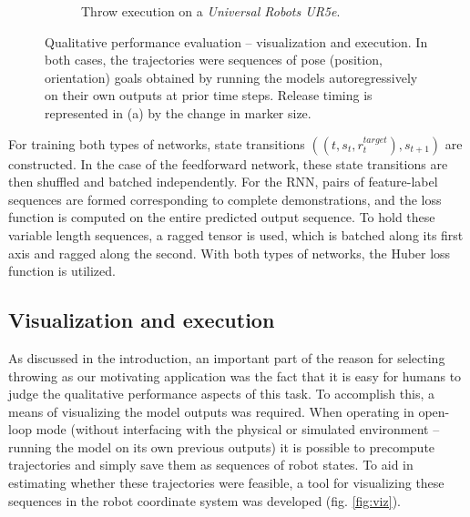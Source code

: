 \documentclass{article}
\begin{document}
\begin{figure}
{\begin{subfigure}{0.48\textwidth}
			\caption{Throw execution on a \emph{Universal Robots UR5e}.}
			\label{fig:exec}
		\end{subfigure}
	}
	\caption{Qualitative performance evaluation -- visualization and execution. In both cases, the trajectories were sequences of pose (position, orientation) goals obtained by running the models autoregressively on their own outputs at prior time steps. Release timing is represented in (a) by the change in marker size.}
	\label{fig:vis_exec}
\end{figure}

For training both types of networks, state transitions $\left(\left(t,s_t,r^{target}_t\right), s_{t+1}\right)$ are constructed. In the case of the feedforward network, these state transitions are then shuffled and batched independently. For the RNN, pairs of feature-label sequences are formed corresponding to complete demonstrations, and the loss function is computed on the entire predicted output sequence. To hold these variable length sequences, a ragged tensor is used, which is batched along its first axis and ragged along the second. With both types of networks, the Huber loss function is utilized.

\subsection{Visualization and execution}
\label{sec:exec}

As discussed in the introduction, an important part of the reason for selecting throwing as our motivating application was the fact that it is easy for humans to judge the qualitative performance aspects of this task. To accomplish this, a means of visualizing the model outputs was required. When operating in open-loop mode (without interfacing with the physical or simulated environment -- running the model on its own previous outputs) it is possible to precompute trajectories and simply save them as sequences of robot states. To aid in estimating whether these trajectories were feasible, a tool for visualizing these sequences in the robot coordinate system was developed (fig. \ref{fig:viz}).
\end{document}
